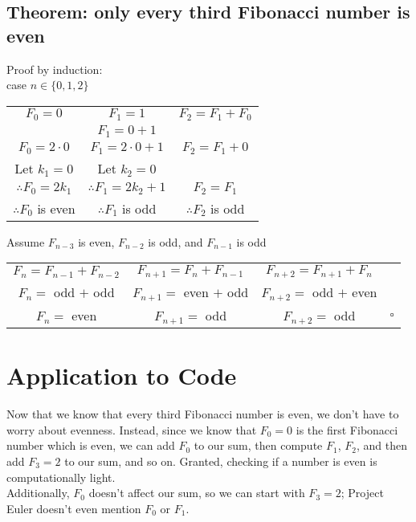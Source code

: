 \documentclass[11pt, oneside]{article}   	%
\begin{document}
	\subsection{Theorem: only every third Fibonacci number is even}
		Proof by induction:\\
		case $n \in \{0, 1, 2\}$
		\begin{center}
		\begin{tabular}{c|c|c}
			$F_0 = 0$&$F_1 = 1$&$F_2 = F_1 + F_0$\\
			&$F_1 = 0 + 1$&\\
			$F_0 = 2\cdot 0$&$F_1 = 2\cdot0 + 1$&$F_2 =  F_1 + 0$\\
			Let $k_1 = 0$&Let $k_2 = 0$&\\
			$\therefore F_0 = 2k_1$&$\therefore F_1 = 2k_2 + 1$&$F_2 = F_1$\\
			$\therefore F_0$ is even&$\therefore F_1$ is odd&$\therefore F_2$ is odd\\
		\end{tabular}
		\end{center}
		Assume $F_{n - 3}$ is even, $F_{n - 2}$ is odd, and $F_{n - 1}$ is odd
		\begin{center}
		\begin{tabular}{c|c|c c}
			$F_n = F_{n - 1} + F_{n - 2}$&$F_{n+1} = F_n + F_{n - 1}$&$F_{n+2} = F_{n + 1} + F_n$&\\
			$F_n =$ odd $+ $ odd&$F_{n+1} =$ even $+$ odd&$F_{n+ 2} =$ odd $+$ even&\\
			$F_n =$ even&$F_{n+1} =$ odd& $F_{n+2} =$ odd&$\square$
		\end{tabular}
		\end{center}

\section{Application to Code}
	Now that we know that every third Fibonacci number is even, we don't have to worry about evenness. Instead, since we know that $F_0 = 0$ is the first Fibonacci number which is even, we can add $F_0$ to our sum, then compute $F_1$, $F_2$, and then add $F_3=2$ to our sum, and so on. Granted, checking if a number is even is computationally light.\\

	Additionally, $F_0$ doesn't affect our sum, so we can start with $F_3=2$; Project Euler doesn't even mention $F_0$ or $F_1$.

\end{document}
